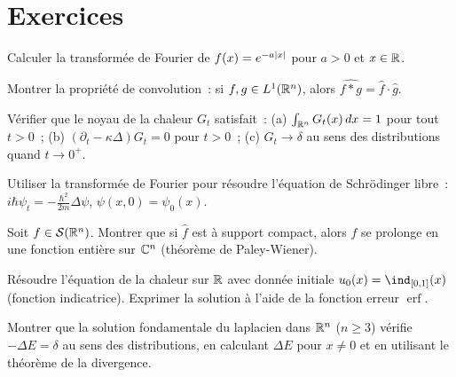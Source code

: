\section{Exercices}

\begin{exercice}
Calculer la transform\'ee de Fourier de $f(x) = e^{-a\left| x \right|}$ pour $a > 0$
et $x \in \mathbb{R}$.
\end{exercice}

\begin{exercice}
Montrer la propri\'et\'e de convolution~: si $f, g \in L^1(\mathbb{R}^n)$, alors
$\widehat{f * g} = \hat{f} \cdot \hat{g}$.
\end{exercice}

\begin{exercice}
V\'erifier que le noyau de la chaleur $G_t$ satisfait~:
(a) $\int_{\mathbb{R}^n} G_t(x)\, dx = 1$ pour tout $t > 0$~;
(b) $(\partial_t - \kappa \Delta)G_t = 0$ pour $t > 0$~;
(c) $G_t \to \delta$ au sens des distributions quand $t \to 0^+$.
\end{exercice}

\begin{exercice}
Utiliser la transform\'ee de Fourier pour r\'esoudre l'\'equation de Schr\"odinger
libre~: $i\hbar \psi_t = -\frac{\hbar^2}{2m}\Delta \psi$, $\psi(x,0) = \psi_0(x)$.
\end{exercice}

\begin{exercice}
Soit $f \in \mathcal{S}(\mathbb{R}^n)$. Montrer que si $\hat{f}$ est \`a support compact,
alors $f$ se prolonge en une fonction enti\`ere sur $\mathbb{C}^n$ (th\'eor\`eme de
Paley-Wiener).
\end{exercice}

\begin{exercice}
R\'esoudre l'\'equation de la chaleur sur $\mathbb{R}$ avec donn\'ee initiale
$u_0(x) = \ind_{[0,1]}(x)$ (fonction indicatrice). Exprimer la solution
\`a l'aide de la fonction erreur $\operatorname{erf}$.
\end{exercice}

\begin{exercice}
Montrer que la solution fondamentale du laplacien dans $\mathbb{R}^n$ ($n \geq 3$) v\'erifie
$-\Delta E = \delta$ au sens des distributions, en calculant $\Delta E$ pour $x \neq 0$
et en utilisant le th\'eor\`eme de la divergence.
\end{exercice}
